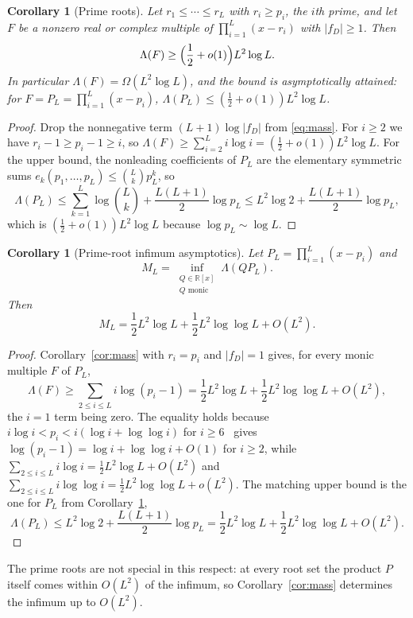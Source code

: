 \documentclass[11pt]{article}
\newtheorem{corollary}[theorem]{Corollary}
\newcommand{\R}{\mathbb R}
\begin{document}
\begin{corollary}[Prime roots]\label{cor:prime}
Let $r_1\le\cdots\le r_L$ with $r_i\ge p_i$, the $i$th prime, and let $F$ be
a nonzero real or complex multiple of $\prod_{i=1}^L(x-r_i)$ with $|f_D|\ge1$.  Then
\[
 \Lambda(F)\ge\Bigl(\frac12+o(1)\Bigr)L^2\log L .
\]
In particular $\Lambda(F)=\Omega(L^2\log L)$, and the bound is asymptotically
attained: for $F=P_L=\prod_{i=1}^L(x-p_i)$,
$\Lambda(P_L)\le(\tfrac12+o(1))L^2\log L$.
\end{corollary}

\begin{proof}
Drop the nonnegative term $(L+1)\log|f_D|$ from \eqref{eq:mass}.  For
$i\ge2$ we have $r_i-1\ge p_i-1\ge i$, so
$\Lambda(F)\ge\sum_{i=2}^Li\log i=(\frac12+o(1))L^2\log L$.  For the upper
bound, the nonleading coefficients of $P_L$ are the elementary symmetric
sums $e_k(p_1,\ldots,p_L)\le\binom{L}{k}p_L^k$, so
\[
 \Lambda(P_L)\le\sum_{k=1}^L\log\binom{L}{k}
 +\frac{L(L+1)}2\log p_L
 \le L^2\log2+\frac{L(L+1)}2\log p_L,
\]
which is $(\tfrac12+o(1))L^2\log L$ because $\log p_L\sim\log L$.
\end{proof}

\begin{corollary}[Prime-root infimum asymptotics]\label{cor:infimum}
Let $P_L=\prod_{i=1}^L(x-p_i)$ and
\[
  M_L=\inf_{\substack{Q\in\R[x]\\ Q\text{ monic}}}\Lambda(QP_L).
\]
Then
\[
  M_L=\frac12L^2\log L+\frac12L^2\log\log L+O(L^2).
\]
\end{corollary}

\begin{proof}
Corollary~\ref{cor:mass} with $r_i=p_i$ and $|f_D|=1$ gives, for every monic
multiple $F$ of $P_L$,
\[
  \Lambda(F)\ge\sum_{2\le i\le L}i\log(p_i-1)
  =\frac12L^2\log L+\frac12L^2\log\log L+O(L^2),
\]
the $i=1$ term being zero.  The equality holds because
$i\log i<p_i<i(\log i+\log\log i)$ for $i\ge6$~\cite{rosser-schoenfeld}
gives $\log(p_i-1)=\log i+\log\log i+O(1)$ for $i\ge2$, while
$\sum_{2\le i\le L}i\log i=\frac12L^2\log L+O(L^2)$ and
$\sum_{2\le i\le L}i\log\log i=\frac12L^2\log\log L+o(L^2)$.  The matching upper
bound is the one for $P_L$ from Corollary~\ref{cor:prime},
\[
  \Lambda(P_L)\le L^2\log2+\frac{L(L+1)}2\log p_L
  =\frac12L^2\log L+\frac12L^2\log\log L+O(L^2).
\]
\end{proof}

The prime roots are not special in this respect: at every root set the
product $P$ itself comes within $O(L^2)$ of the infimum, so
Corollary~\ref{cor:mass} determines the infimum up to $O(L^2)$.
\end{document}
